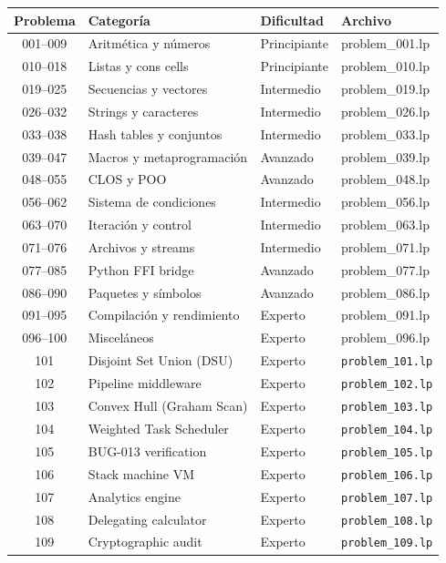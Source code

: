 \begin{center}
\footnotesize
\begin{tabular}{clll}
\toprule
Problema & Categoría & Dificultad & Archivo \\
\midrule
001--009 & Aritmética y números & Principiante & problem\_001.lp \\
010--018 & Listas y cons cells & Principiante & problem\_010.lp \\
019--025 & Secuencias y vectores & Intermedio & problem\_019.lp \\
026--032 & Strings y caracteres & Intermedio & problem\_026.lp \\
033--038 & Hash tables y conjuntos & Intermedio & problem\_033.lp \\
039--047 & Macros y metaprogramación & Avanzado & problem\_039.lp \\
048--055 & CLOS y POO & Avanzado & problem\_048.lp \\
056--062 & Sistema de condiciones & Intermedio & problem\_056.lp \\
063--070 & Iteración y control & Intermedio & problem\_063.lp \\
071--076 & Archivos y streams & Intermedio & problem\_071.lp \\
077--085 & Python FFI bridge & Avanzado & problem\_077.lp \\
086--090 & Paquetes y símbolos & Avanzado & problem\_086.lp \\
091--095 & Compilación y rendimiento & Experto & problem\_091.lp \\
096--100 & Misceláneos & Experto & problem\_096.lp \\
101 & Disjoint Set Union (DSU) & Experto & \texttt{problem\_101.lp} \\
102 & Pipeline middleware & Experto & \texttt{problem\_102.lp} \\
103 & Convex Hull (Graham Scan) & Experto & \texttt{problem\_103.lp} \\
104 & Weighted Task Scheduler & Experto & \texttt{problem\_104.lp} \\
105 & BUG-013 verification & Experto & \texttt{problem\_105.lp} \\
106 & Stack machine VM & Experto & \texttt{problem\_106.lp} \\
107 & Analytics engine & Experto & \texttt{problem\_107.lp} \\
108 & Delegating calculator & Experto & \texttt{problem\_108.lp} \\
109 & Cryptographic audit & Experto & \texttt{problem\_109.lp} \\

\end{tabular}
\end{center}
